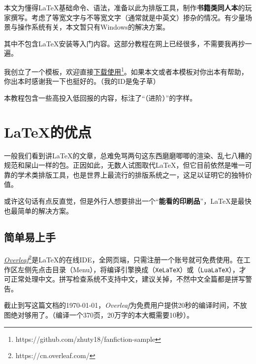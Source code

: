 \documentclass[10pt,openany]{book}
\begin{document}

\pagestyle{mystyle}

\startcontents[tutorial]

\mytitlepage

\null\vfill

本文为懂得\LaTeX 基础命令、语法，准备以此为排版工具，制作\textbf{书籍类同人本}的玩家撰写。考虑了等宽文字与不等宽文字（通常就是中英文）掺杂的情况。有少量场景与操作系统有关，本文暂只有Windows的解决方案。

其中不包含\LaTeX 安装等入门内容。这部分教程在网上已经很多，不需要我再抄一遍。

我创立了一个模板，欢迎直接\href{https://github.com/zhuty18/fanfiction-sample}{下载使用\footnote{https://github.com/zhuty18/fanfiction-sample}}。如果本文或者本模板对你出本有帮助，你出本时感谢我一下也挺好的。（我的ID是兔子草）

本教程包含一些高投入低回报的内容，标注了“（进阶）”的字样。

\vfill\vfill

\tableofcontents

\cleardoublepage

\setcounter{page}{1}

\chapter{\LaTeX 的优点}

一般我们看到讲\LaTeX 的文章，总难免骂两句这东西磨磨唧唧的渲染、乱七八糟的规范和屎山一样的包。正因如此，无数人试图取代\LaTeX ，但它目前依然是唯一可靠的学术类排版工具，也是世界上最流行的排版系统之一，这足以证明它的独特价值。

或许这句话有点反直觉，但是外行人想要排出一个“\textbf{能看的印刷品}”，\LaTeX 是最快也最简单的解决方案。

\section{简单易上手}

\href{https://cn.overleaf.com/}{\textit{Overleaf}\footnote{https://cn.overleaf.com/}}是\LaTeX 的在线IDE，全网页端，只需注册一个账号就可免费使用。在工作区左侧先点击目录（Menu），将编译引擎换成\XeLaTeX（\texttt{XeLaTeX}）或\LuaLaTeX（\texttt{LuaLaTeX}），才可正常处理中文。拼写检查系统不支持中文，建议关掉，不然中文全篇都是拼写警告。

截止到写这篇文档的\today，\textit{Overleaf}为免费用户提供20秒的编译时间，不放图绝对够用了。（编译一个370页，20万字的本大概需要10秒）。
\end{document}
